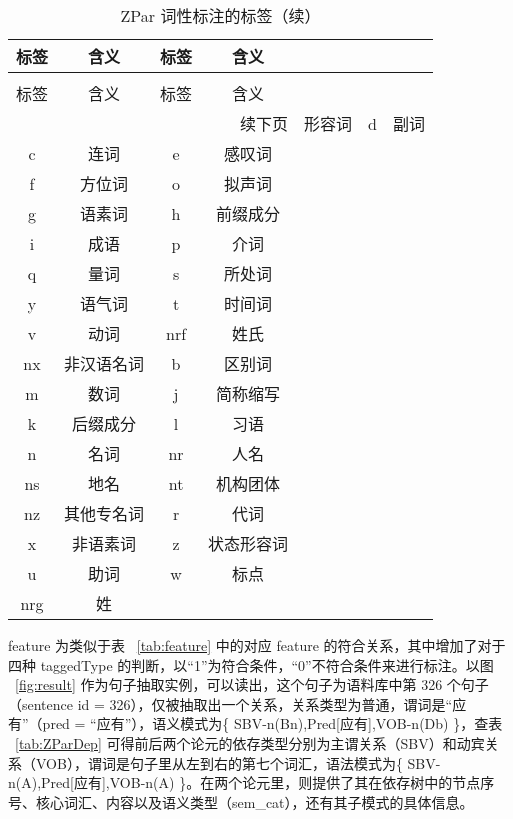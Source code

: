 \begin{longtable}{|c|c|c|c|}
\caption[ZPar 词性标注标签]{ZPar 词性标注的标签} \label{tab:ZParSem} \\
\toprule[1.5pt]
 标签 & 含义 & 标签 & 含义 \\
\midrule[1pt]
\endfirsthead
\caption[]{ZPar 词性标注的标签（续）} \\
\toprule[1.5pt]
 标签 & 含义 & 标签 & 含义 \\
\midrule[1pt]
\endhead
\hline
\multicolumn{4}{r}{\small 续下页}
\endfoot
\bottomrule[1.5pt]
\endlastfoot
    a    &   形容词    &  d     &   副词    \\
    \hline
    c     &   连词    & e    &   感叹词    \\
    \hline
    f     &   方位词     & o    &   拟声词    \\
    \hline
    g     &   语素词      & h    &   前缀成分    \\
    \hline
    i    &   成语      & p    &   介词    \\
    \hline
    q    &   量词     & s    &   所处词    \\
    \hline
    y    &   语气词      & t    &   时间词    \\
    \hline
    v    &   动词       & nrf    &   姓氏    \\
    \hline
    nx    &   非汉语名词     & b    &   区别词    \\
    \hline
    m    &   数词      &  j    &   简称缩写    \\
    \hline
    k    &   后缀成分      & l    &   习语    \\
    \hline
    n    &   名词      & nr    &   人名    \\
    \hline
    ns    &   地名     & nt    &   机构团体    \\
    \hline
     nz    &   其他专名词      & r    &   代词    \\
    \hline
     x    &   非语素词      & z    &   状态形容词    \\
    \hline
     u    &   助词      & w    &   标点    \\
    \hline
     nrg    &   姓      &     &       \\
\end{longtable}

feature 为类似于表 ~\ref{tab:feature} 中的对应 feature 的符合关系，其中增加了对于四种 taggedType 的判断，以“1”为符合条件，“0”不符合条件来进行标注。以图 ~\ref{fig:result} 作为句子抽取实例，可以读出，这个句子为语料库中第 326 个句子（sentence id = 326），仅被抽取出一个关系，关系类型为普通，谓词是“应有”（pred = “应有”），语义模式为\{ SBV-n(Bn),Pred[应有],VOB-n(Db) \}，查表 ~\ref{tab:ZParDep} 可得前后两个论元的依存类型分别为主谓关系（SBV）和动宾关系（VOB），谓词是句子里从左到右的第七个词汇，语法模式为\{ SBV-n(A),Pred[应有],VOB-n(A) \}。在两个论元里，则提供了其在依存树中的节点序号、核心词汇、内容以及语义类型（sem\_cat），还有其子模式的具体信息。

